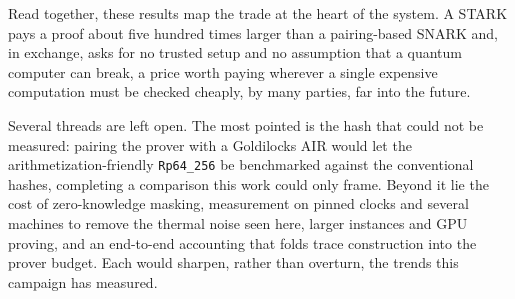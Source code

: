 \documentclass[11pt]{article}
\begin{document}
Read together, these results map the trade at the heart of the system. A STARK pays a proof about five
hundred times larger than a pairing-based SNARK and, in exchange, asks for no trusted setup and no
assumption that a quantum computer can break, a price worth paying wherever a single expensive
computation must be checked cheaply, by many parties, far into the future.

Several threads are left open. The most pointed is the hash that could not be measured: pairing the
prover with a Goldilocks AIR would let the arithmetization-friendly \texttt{Rp64\_256} be benchmarked
against the conventional hashes, completing a comparison this work could only frame. Beyond it lie the
cost of zero-knowledge masking, measurement on pinned clocks and several machines to remove the thermal
noise seen here, larger instances and GPU proving, and an end-to-end accounting that folds trace
construction into the prover budget. Each would sharpen, rather than overturn, the trends this campaign
has measured.

\end{document}
